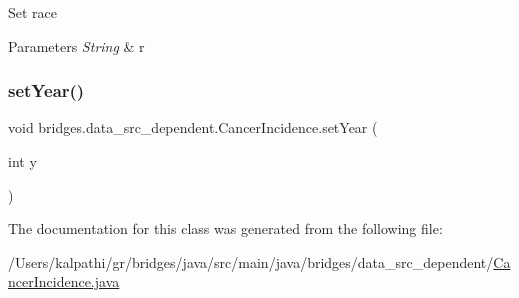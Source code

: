 Set race


\begin{DoxyParams}{Parameters}
{\em String} & r \\
\hline
\end{DoxyParams}
\mbox{\label{classbridges_1_1data__src__dependent_1_1_cancer_incidence_aa5524736b76d67f1248d1a05d9f596a9}} 
\subsubsection{\texorpdfstring{setYear()}{setYear()}}
{\footnotesize\ttfamily void bridges.\+data\+\_\+src\+\_\+dependent.\+Cancer\+Incidence.\+set\+Year (\begin{DoxyParamCaption}\item[{int}]{y }\end{DoxyParamCaption})}



The documentation for this class was generated from the following file\+:\begin{DoxyCompactItemize}
\item 
/\+Users/kalpathi/gr/bridges/java/src/main/java/bridges/data\+\_\+src\+\_\+dependent/\mbox{\hyperlink{_cancer_incidence_8java}{Cancer\+Incidence.\+java}}\end{DoxyCompactItemize}
